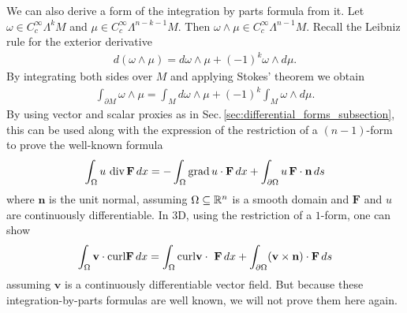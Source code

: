 \documentclass[../master_thesis.tex]{subfiles}
\begin{document}
We can also derive a form of the integration by parts formula from it. 
Let $\omega \in C_c^\infty \Lambda^k M$ and $\mu \in C_c^\infty \Lambda^{n-k-1}  M$. 
Then $\omega \wedge \mu \in C_c^\infty \Lambda^{n-1} M$. Recall the 
Leibniz rule for the exterior derivative 
\begin{align*}
    d(\omega \wedge \mu) = d\omega \wedge \mu + (-1)^k \omega \wedge d\mu. 
\end{align*}
By integrating both sides over $M$ and applying Stokes' theorem we obtain
\begin{align*}
    \int_{\partial M} \omega \wedge \mu 
    = \int_M d\omega \wedge \mu + (-1)^k \int_M \omega \wedge d\mu.
\end{align*}
By using vector and scalar proxies as in Sec.\,\ref{sec:differential_forms_subsection},
this can be used along with the expression of the restriction of a $(n-1)$-form to 
prove the well-known formula
\begin{align*}
    \int_\Omega u\,\operatorname{div} \mathbf{F} \, dx 
    =  - \int_\Omega \operatorname{grad} u \cdot \mathbf{F} \, dx + 
        \int_{\partial \Omega } u \, \mathbf{F}\cdot \mathbf{n} \, ds
\end{align*}
where $\mathbf{n}$ is the unit normal, assuming $\Omega \subseteq \mathbb{R}^n$ is a smooth domain
and $\mathbf{F}$ and $u$ are continuously differentiable.
In 3D, using the restriction of a $1$-form, one can show
\begin{align*}
    \int_\Omega \mathbf{v} \cdot \mathbf{\operatorname{curl}} \mathbf{F} \, dx
    = \int_\Omega \mathbf{\operatorname{curl}} \mathbf{v} \cdot \ \mathbf{F} \, dx
        + \int_{\partial \Omega } (\mathbf{v} \times \mathbf{n})\cdot \mathbf{F} \, ds
\end{align*}
assuming $\mathbf{v}$ is a continuously differentiable vector field. But 
because these integration-by-parts formulas are well known, we will not prove
them here again.
\end{document}

